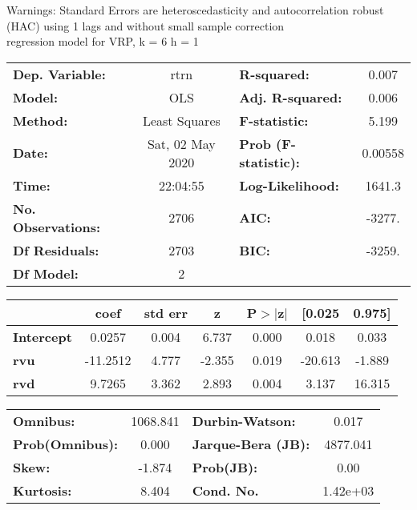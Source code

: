 Warnings: \newline
 [1] Standard Errors are heteroscedasticity and autocorrelation robust (HAC) using 1 lags and without small sample correction\\ 

regression model for VRP, k = 6 h = 1\begin{center}
\begin{tabular}{lclc}
\toprule
\textbf{Dep. Variable:}    &       rtrn       & \textbf{  R-squared:         } &     0.007   \\
\textbf{Model:}            &       OLS        & \textbf{  Adj. R-squared:    } &     0.006   \\
\textbf{Method:}           &  Least Squares   & \textbf{  F-statistic:       } &     5.199   \\
\textbf{Date:}             & Sat, 02 May 2020 & \textbf{  Prob (F-statistic):} &  0.00558    \\
\textbf{Time:}             &     22:04:55     & \textbf{  Log-Likelihood:    } &    1641.3   \\
\textbf{No. Observations:} &        2706      & \textbf{  AIC:               } &    -3277.   \\
\textbf{Df Residuals:}     &        2703      & \textbf{  BIC:               } &    -3259.   \\
\textbf{Df Model:}         &           2      & \textbf{                     } &             \\
\bottomrule
\end{tabular}
\begin{tabular}{lcccccc}
                   & \textbf{coef} & \textbf{std err} & \textbf{z} & \textbf{P$> |$z$|$} & \textbf{[0.025} & \textbf{0.975]}  \\
\midrule
\textbf{Intercept} &       0.0257  &        0.004     &     6.737  &         0.000        &        0.018    &        0.033     \\
\textbf{rvu}       &     -11.2512  &        4.777     &    -2.355  &         0.019        &      -20.613    &       -1.889     \\
\textbf{rvd}       &       9.7265  &        3.362     &     2.893  &         0.004        &        3.137    &       16.315     \\
\bottomrule
\end{tabular}
\begin{tabular}{lclc}
\textbf{Omnibus:}       & 1068.841 & \textbf{  Durbin-Watson:     } &    0.017  \\
\textbf{Prob(Omnibus):} &   0.000  & \textbf{  Jarque-Bera (JB):  } & 4877.041  \\
\textbf{Skew:}          &  -1.874  & \textbf{  Prob(JB):          } &     0.00  \\
\textbf{Kurtosis:}      &   8.404  & \textbf{  Cond. No.          } & 1.42e+03  \\
\bottomrule
\end{tabular}
\end{center}

